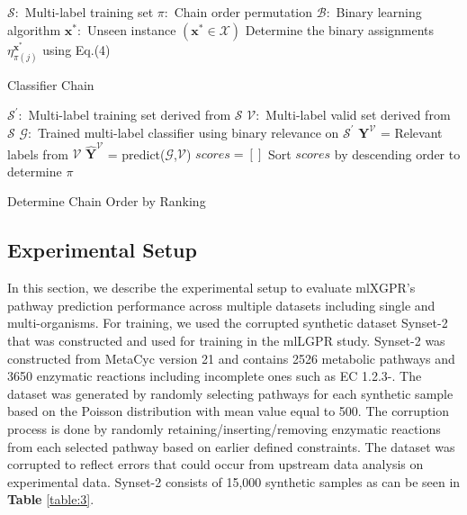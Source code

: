 \documentclass[sn-mathphys,Numbered]{sn-jnl}%
\theoremstyle{thmstyleone}%
\theoremstyle{thmstyletwo}%
\theoremstyle{thmstylethree}%
\begin{document}
\begin{algorithm}[hb]
\KwIn{}
$\mathcal{S}:$ Multi-label training set\;
$\pi:$ Chain order permutation\;
$\mathcal{B}:$ Binary learning algorithm\;
$\textbf{x}^*:$ Unseen instance $(\textbf{x}^*\in \mathcal{X})$\;
Determine the binary assignments $\eta^{\textbf{x}^*}_{\pi (j)}$ using Eq.(4)\;
\caption{Classifier Chain\cite{zhangBinaryRelevanceMultilabel2018}}\label{alg:2}
\end{algorithm}

\begin{algorithm}
\KwIn{}
$\mathcal{S}^{'}:$ Multi-label training set derived from $\mathcal{S}$\;
$\mathcal{V}:$ Multi-label valid set derived from $\mathcal{S}$\;
$\mathcal{G}:$ Trained multi-label classifier using binary relevance on $\mathcal{S}^{'}$\;
\KwOut{$\pi$}
$\textbf{Y}^{\mathcal{V}}$ = Relevant labels from $\mathcal{V}$\;
$\mathbf{\hat{Y}}^{\mathcal{V}}$ = predict($\mathcal{G}$,$\mathcal{V}$)\;
$scores=[]$\;
Sort $scores$ by descending order to determine $\pi$\;
\Return{$\pi$}
\caption{Determine Chain Order by Ranking}\label{alg:3}
\end{algorithm}

\subsection{Experimental Setup}
In this section, we describe the experimental setup to evaluate mlXGPR's pathway prediction performance across multiple datasets including single and multi-organisms. 
For training, we used the corrupted synthetic dataset Synset-2 that was constructed and used  for training in the mlLGPR study. 
Synset-2 was constructed from MetaCyc version 21 and contains 2526 metabolic pathways and 3650 enzymatic reactions including incomplete ones such as EC 1.2.3-. 
The dataset was generated by randomly selecting pathways for each synthetic sample based on the Poisson distribution with mean value equal to 500. 
The corruption process is done by randomly retaining/inserting/removing enzymatic reactions from each selected pathway based on earlier defined constraints. 
The dataset was corrupted to reflect errors that could occur from upstream data analysis on experimental data.
Synset-2 consists of 15,000 synthetic samples as can be seen in \textbf{Table} \ref{table:3}.
\end{document}
